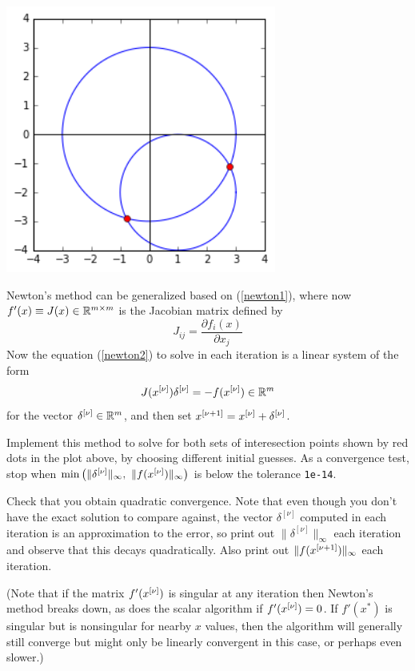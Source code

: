 \documentclass[10pt]{article}
\begin{document}
\hfil\includegraphics[width=3.5in]{circles.png}\hfil

Newton's method can be generalized based on (\ref{newton1}), 
where now $f'(x) \equiv J(x) \in \mathbb{R}^{m\times m}$
is the Jacobian matrix defined by
\[
J_{ij} = \frac{\partial f_i(x)}{\partial x_j}
\]
Now the equation (\ref{newton2}) to solve in each iteration is a linear system of
the form
\[
J(x^{[\nu]})\delta^{[\nu]} = -f(x^{[\nu]}) \in \mathbb{R}^m
\]
for the vector $\delta^{[\nu]} \in \mathbb{R}^m$, and then set $x^{[\nu+1]} = x^{[\nu]} +
\delta^{[\nu]}$.

Implement this method to solve for both sets of interesection points shown by red
dots in the plot above, by choosing different initial guesses.
As a convergence test, stop when
$\min\left(\|\delta^{[\nu]}\|_\infty,~\|f(x^{[\nu]})\|_\infty\right)$ 
is below the tolerance {\tt 1e-14}.  

Check that you obtain quadratic convergence.  Note that even though you don't have
the exact solution to compare against, the vector $\delta^{[\nu]}$ computed in each
iteration is an approximation to the error, so print out
$\|\delta^{[\nu]}\|_\infty$ each iteration and observe that this
decays quadratically.  Also print out $\|f(x^{[\nu+1]})\|_\infty$ each iteration.

(Note that if the matrix $f'(x^{[\nu]})$ is singular at any iteration then Newton's
method breaks down, as does the scalar algorithm if $f'(x^{[\nu]})=0$.  If $f'(x^*)$
is singular but is nonsingular for nearby $x$ values,
then the algorithm will generally still converge but 
might only be linearly convergent in this case, or perhaps even slower.)

\end{document}
